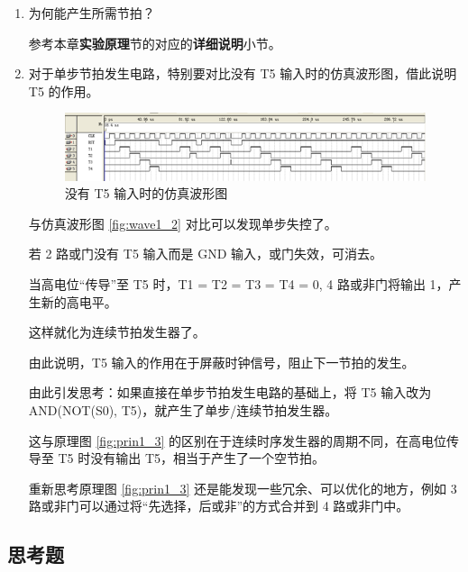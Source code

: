 \begin{enumerate}
    \item 为何能产生所需节拍？
    
    参考本章\textbf{实验原理}节的对应的\textbf{详细说明}小节。
    
    \item 对于单步节拍发生电路，特别要对比没有 T5 输入时的仿真波形图，借此说明 T5 的作用。
    
    \begin{figure}[H]
    \centering
    \includegraphics[width=\textwidth]{images/wave1_2_1.png}
    \caption{没有 T5 输入时的仿真波形图}
    \label{fig:wave1_2_1}
    \end{figure}
    
    与仿真波形图 \ref{fig:wave1_2} 对比可以发现单步失控了。
    
    若 2 路或门没有 T5 输入而是 GND 输入，或门失效，可消去。
    
    当高电位“传导”至 T5 时，T1 = T2 = T3 = T4 = 0, 4 路或非门将输出 1，产生新的高电平。
    
    这样就化为连续节拍发生器了。
    
    由此说明，T5 输入的作用在于屏蔽时钟信号，阻止下一节拍的发生。
    
    由此引发思考：如果直接在单步节拍发生电路的基础上，将 T5 输入改为 AND(NOT(S0), T5)，就产生了单步/连续节拍发生器。
    
    这与原理图 \ref{fig:prin1_3} 的区别在于连续时序发生器的周期不同，在高电位传导至 T5 时没有输出 T5，相当于产生了一个空节拍。
    
    重新思考原理图 \ref{fig:prin1_3} 还是能发现一些冗余、可以优化的地方，例如 3 路或非门可以通过将“先选择，后或非”的方式合并到 4 路或非门中。
    
\end{enumerate}

\subsection{思考题}

